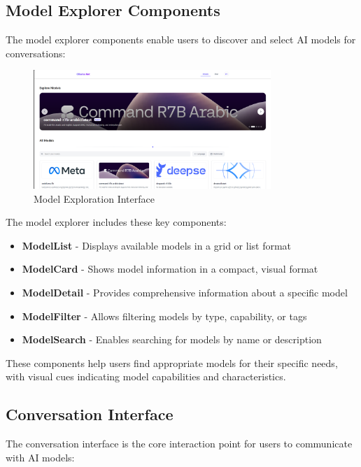 \subsection{Model Explorer Components}

The model explorer components enable users to discover and select AI models for conversations:

\begin{figure}[h]
    \centering
    \includegraphics[width=0.8\textwidth]{./Chapter07/figures/model_explorer_ui.png}
    \caption{Model Exploration Interface}
    \label{fig:model-explorer-ui}
\end{figure}

The model explorer includes these key components:

\begin{itemize}
  \item \textbf{ModelList} - Displays available models in a grid or list format
  \item \textbf{ModelCard} - Shows model information in a compact, visual format
  \item \textbf{ModelDetail} - Provides comprehensive information about a specific model
  \item \textbf{ModelFilter} - Allows filtering models by type, capability, or tags
  \item \textbf{ModelSearch} - Enables searching for models by name or description
\end{itemize}

These components help users find appropriate models for their specific needs, with visual cues indicating model capabilities and characteristics.

\subsection{Conversation Interface}

The conversation interface is the core interaction point for users to communicate with AI models:

